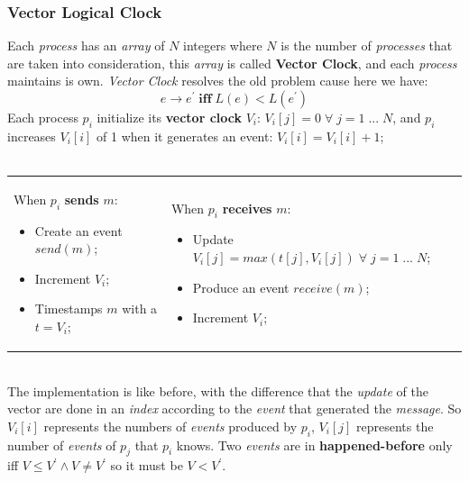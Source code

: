 \documentclass{article}
\begin{document}
\subsubsection{Vector Logical Clock}
Each \emph{process} has an \emph{array} of $N$ integers where $N$ is the number of \emph{processes} that are taken into consideration, this \emph{array} is called \textbf{Vector Clock}, and each \emph{process} maintains is own. \emph{Vector Clock} resolves the old problem cause here we have:
\[e \rightarrow e^{'}\; \mathbf{iff}\; L(e) < L(e^{'})\] 
Each process $p_i$ initialize its \textbf{vector clock} $V_i$: $V_i[j]=0\; \forall \; j= 1\;...\;N$, and $p_i$ increases $V_i[i]$ of 1 when it generates an event: $V_i[i] = V_i[i] +1$;
\\\\
\begin{tabular}{C{7cm}  L{8cm}}
When $p_i$ \textbf{sends} $m$:
\begin{itemize}
\item Create an event $send(m)$;
\item Increment $V_i$;
\item Timestamps $m$ with a $t=V_i$;
\end{itemize}
&
When $p_i$ \textbf{receives} $m$:
\begin{itemize}
\item Update $V_i[j] = max(t[j], V_i[j])\; \forall \; j=1\;...\;N$;
\item Produce an event $receive(m)$;
\item Increment $V_i$;
\end{itemize}
\end{tabular}\\ 
The implementation is like before, with the difference that the \emph{update} of the vector are done in an \emph{index} according to the \emph{event} that generated the \emph{message}. So $V_i[i]$ represents the numbers of \emph{events} produced by $p_i$, $V_i[j]$ represents the number of \emph{events} of $p_j$ that $p_i$ knows. Two \emph{events} are in \textbf{happened-before} only iff $V \leq V^{'} \wedge V \neq V^{'}$ so it must be $V < V^{'}$. \\
\end{document}
